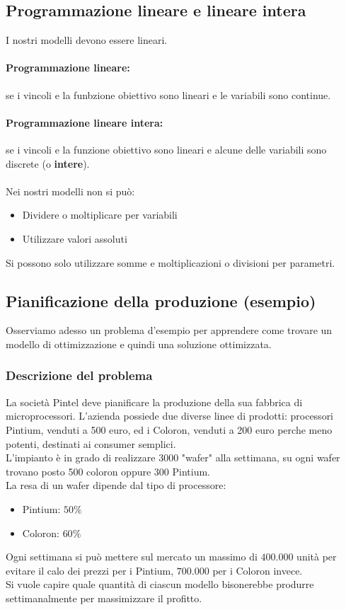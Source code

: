 \documentclass[12pt,a4paper]{article}
\begin{document}
\subsection{Programmazione lineare e lineare intera}
I nostri modelli devono essere lineari.
\paragraph{Programmazione lineare:} se i vincoli e la funbzione obiettivo sono lineari e le variabili sono continue.
\paragraph{Programmazione lineare intera:} se i vincoli e la funzione obiettivo sono lineari e alcune delle variabili sono discrete (o \textbf{intere}).\\\\
Nei nostri modelli non si può:
\begin{itemize}
    \item Dividere o moltiplicare per variabili
    \item Utilizzare valori assoluti
\end{itemize}
Si possono solo utilizzare somme e moltiplicazioni o divisioni per parametri.

\subsection{Pianificazione della produzione (esempio)}
Osserviamo adesso un problema d'esempio per apprendere come trovare un modello di ottimizzazione e quindi una soluzione ottimizzata.
\subsubsection{Descrizione del problema}
La società Pintel deve pianificare la produzione della sua fabbrica di microprocessori. L'azienda possiede due diverse linee di prodotti: processori Pintium, venduti a 500 euro, ed i Coloron, venduti a 200 euro perche meno potenti, destinati ai consumer semplici.\\
L'impianto è in grado di realizzare 3000 "wafer" alla settimana, su ogni wafer trovano posto 500 coloron oppure 300 Pintium.\\
La resa di un wafer dipende dal tipo di processore:
\begin{itemize}
    \item Pintium: $50\%$
    \item Coloron: $60\%$
\end{itemize}
Ogni settimana si può mettere sul mercato un massimo di $400.000$ unità per evitare il calo dei prezzi per i Pintium, $700.000$ per i Coloron invece.\\
Si vuole capire quale quantità di ciascun modello bisonerebbe produrre settimanalmente per massimizzare il profitto.
\end{document}
